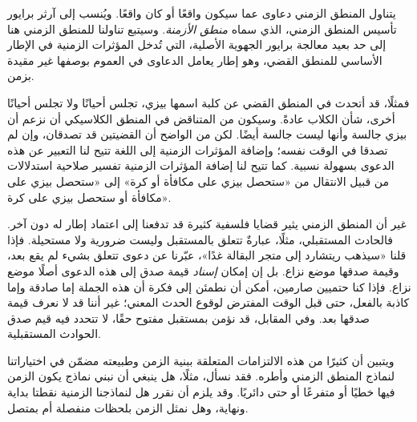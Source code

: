 \documentclass[../../../include/open-logic-section]{subfiles}
\begin{document}


يتناول المنطق الزمني دعاوى عما سيكون واقعًا أو كان واقعًا. ويُنسب إلى آرثر
برايور تأسيس المنطق الزمني، الذي سماه \emph{منطق الأزمنة}. وسيتبع تناولنا
للمنطق الزمني هنا إلى حد بعيد معالجة برايور الجهوية الأصلية، التي تُدخل
المؤثرات الزمنية في الإطار الأساسي للمنطق القضي، وهو إطار يعامل الدعاوى في
العموم بوصفها غير مقيدة بزمن.

فمثلًا، قد أتحدث في المنطق القضي عن كلبة اسمها بيزي، تجلس أحيانًا ولا تجلس
أحيانًا أخرى، شأن الكلاب عادةً. وسيكون من المتناقض في المنطق الكلاسيكي أن
نزعم أن بيزي جالسة وأنها ليست جالسة أيضًا. لكن من الواضح أن القضيتين قد
تصدقان، وإن لم تصدقا في الوقت نفسه؛ وإضافة المؤثرات الزمنية إلى اللغة تتيح لنا
التعبير عن هذه الدعوى بسهولة نسبية. كما تتيح لنا إضافة المؤثرات الزمنية
تفسير صلاحية استدلالات من قبيل الانتقال من «ستحصل بيزي على مكافأة أو كرة»
إلى «ستحصل بيزي على مكافأة أو ستحصل بيزي على كرة».

غير أن المنطق الزمني يثير قضايا فلسفية كثيرة قد تدفعنا إلى اعتماد إطار له
  دون آخر. فالحادث المستقبلي، مثلًا، عبارةٌ تتعلق بالمستقبل وليست ضرورية
  ولا مستحيلة. فإذا قلنا «سيذهب ريتشارد إلى متجر البقالة غدًا»، عبّرنا عن دعوى
تتعلق بشيء لم يقع بعد، وقيمة صدقها موضع نزاع. بل إن إمكان \emph{إسناد}
قيمة صدق إلى هذه الدعوى أصلًا موضع نزاع. فإذا كنا حتميين صارمين، أمكن أن
نطمئن إلى فكرة أن هذه الجملة إما صادقة وإما كاذبة بالفعل، حتى قبل الوقت
المفترض لوقوع الحدث المعني؛ غير أننا قد لا نعرف قيمة صدقها بعد. وفي المقابل،
قد نؤمن بمستقبل مفتوح حقًا، لا تتحدد فيه قيم صدق الحوادث المستقبلية.

ويتبين أن كثيرًا من هذه الالتزامات المتعلقة ببنية الزمن وطبيعته مضمّن في
اختياراتنا لنماذج المنطق الزمني وأطره. فقد نسأل، مثلًا، هل ينبغي أن نبني
نماذج يكون الزمن فيها خطيًا أو متفرعًا أو حتى دائريًا. وقد يلزم أن نقرر هل
لنماذجنا الزمنية نقطتا بداية ونهاية، وهل نمثل الزمن بلحظات منفصلة أم بمتصل.
\end{document}
